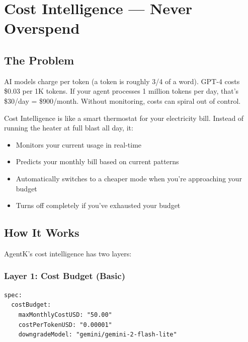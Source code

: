 \documentclass[12pt,a4paper,openany]{report}
\begin{document}
\chapter{Cost Intelligence — Never Overspend}

\section{The Problem}

AI models charge per token (a token is roughly 3/4 of a word). GPT-4 costs \$0.03 per 1K tokens. If your agent processes 1 million tokens per day, that's \$30/day = \$900/month. Without monitoring, costs can spiral out of control.

\begin{analogybox}
Cost Intelligence is like a smart thermostat for your electricity bill. Instead of running the heater at full blast all day, it:
\begin{itemize}
    \item Monitors your current usage in real-time
    \item Predicts your monthly bill based on current patterns
    \item Automatically switches to a cheaper mode when you're approaching your budget
    \item Turns off completely if you've exhausted your budget
\end{itemize}
\end{analogybox}

\section{How It Works}

AgentK's cost intelligence has two layers:

\subsection{Layer 1: Cost Budget (Basic)}

\begin{lstlisting}[style=yaml, caption={Cost budget configuration}]
spec:
  costBudget:
    maxMonthlyCostUSD: "50.00"
    costPerTokenUSD: "0.00001"
    downgradeModel: "gemini/gemini-2-flash-lite"
\end{lstlisting}
\end{document}
